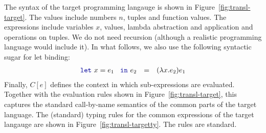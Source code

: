 \documentclass[
		twoside,openright,titlepage,numbers=noenddot,headinclude,%
                footinclude=true,cleardoublepage=empty,
                BCOR=10mm,paper=a4,fontsize=10pt, %
                ngerman,american, %
                ]{scrreprt}
\newcommand{\kvd}[1]{\textnormal{\textcolor{kvdclr}{\ttfamily #1}}}
\begin{document}
The syntax of the target programming langauge is shown in Figure~\ref{fig:transl-target}. 
The values include numbers $n$, tuples and function values.
The expressions include variables $x$, values, lambda abstraction and application and operations 
on tuples. We do not need recursion (although a realistic programming language would include it). 
In what follows, we also use the following syntactic sugar for let binding:
%
\begin{equation*}
\begin{array}{rcl}
  \kvd{let}~x=e_1~\kvd{in}~e_2 &=& (\lambda x.e_2) e_1
\end{array}
\end{equation*}
%
Finally, $C[e]$ defines the context in which sub-expressions are evaluated. Together with the
evaluation rules shown in  Figure~\ref{fig:transl-target}, this captures the standard call-by-name
semantics of the common parts of the target language.
The (standard) typing rules for the common expressions of the target langauge are shown in 
Figure~\ref{fig:transl-targetty}. The rules are standard. 

\end{document}
